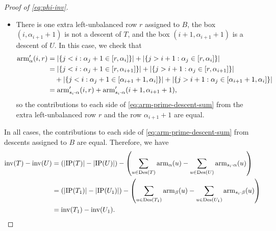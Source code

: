 \begin{proof}[Proof of \eqref{eq:phi-inv}]
\begin{itemize}
        so the contributions to each side of \eqref{eq:arm-prime-descent-sum} from the extra left-unbalanced row \(r\) and the row \(\alpha_{i+1} + 1\) are equal.
        \item There is one extra left-unbalanced row \(r\) assigned to \(B\), the box \((i, \alpha_{i+1} + 1)\) is not a descent of \(T\), and the box \((i+1, \alpha_{i+1} + 1)\) is a descent of \(U\).
        In this case, we check that
        \begin{align*}
            \operatorname{arm}_{\alpha}'(i, r)
            &= \left|\{ j < i : \alpha_j + 1 \in [r, \alpha_{i}] \}\right| +
            \left|\{ j > i+1 : \alpha_j \in [r, \alpha_{i}] \}\right| \\
            &=
            \left|\{ j < i : \alpha_j + 1 \in [r, \alpha_{i+1}] \}\right| +
            \left|\{ j > i+1 : \alpha_j \in [r, \alpha_{i+1}] \}\right| \\
            &\quad+
            \left|\{ j < i : \alpha_j + 1 \in [\alpha_{i+1} + 1, \alpha_i] \}\right| +
            \left|\{ j > i+1 : \alpha_j \in [\alpha_{i+1} + 1, \alpha_i] \}\right| \\
            &=
            \operatorname{arm}_{s_i \cdot \alpha}'(i, r)
            + \operatorname{arm}_{s_i \cdot \alpha}'(i+1, \alpha_{i+1} + 1),
        \end{align*}
        so the contributions to each side of \eqref{eq:arm-prime-descent-sum} from the extra left-unbalanced row \(r\) and the row \(\alpha_{i+1} + 1\) are equal.
    \end{itemize}
    In all cases, the contributions to each side of \eqref{eq:arm-prime-descent-sum} from descents assigned to \(B\) are equal.
    Therefore, we have
    \begin{align*}
        \inv(T) - \inv(U) 
        &= \left(\left|\InversionPairs(T)\right| - \left|\InversionPairs(U)\right|\right)
        - \left(\sum_{u \in \Des(T)} \arm_{\alpha}(u) - \sum_{u \in \Des(U)} \arm_{s_i \permact \alpha}(u)\right) \\
        &= \left(\left|\InversionPairs(T_1)\right| - \left|\InversionPairs(U_1)\right|\right)
        - \left(\sum_{u \in \Des(T_1)} \arm_{\beta}(u) - \sum_{u \in \Des(U_1)} \arm_{s_i \permact \beta}(u)\right) \\
        &= \inv(T_1) - \inv(U_1). 
    \end{align*}


\end{proof}
